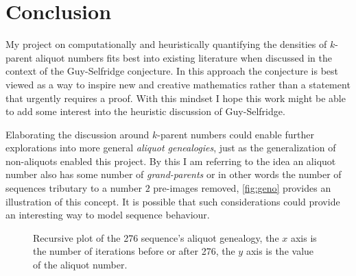 \documentclass{article}
\theoremstyle{definition}
\begin{document}
\section{Conclusion}
My project on computationally and heuristically quantifying the densities of $k$-parent aliquot numbers fits best into existing literature when discussed in the context of the Guy-Selfridge conjecture. In this approach the conjecture is best viewed as a way to inspire new and creative mathematics rather than a statement that urgently requires a proof. With this mindset I hope this work might be able to add some interest into the heuristic discussion of Guy-Selfridge.

Elaborating the discussion around $k$-parent numbers could enable further explorations into more general \textit{aliquot genealogies}, just as the generalization of non-aliquots enabled this project. By this I am referring to the idea an aliquot number also has some number of \textit{grand-parents} or in other words the number of sequences tributary to a number $2$ pre-images removed, \autoref{fig:geno} provides an illustration of this concept. It is possible that such considerations could provide an interesting way to model sequence behaviour.



\begin{figure}
  \caption{Recursive plot of the 276 sequence's aliquot genealogy, the $x$ axis is the number of iterations before or after 276, the $y$ axis is the value of the aliquot number.}
  \label{fig:geno}
\end{figure}


 
\end{document}
